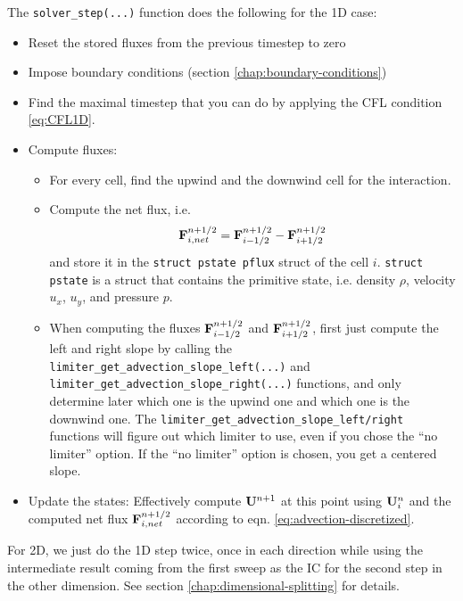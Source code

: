 The \verb|solver_step(...)| function does the following for the 1D case:
\begin{itemize}
	\item 	Reset the stored fluxes from the previous timestep to zero
	\item 	Impose boundary conditions (section \ref{chap:boundary-conditions})
	\item 	Find the maximal timestep that you can do by applying the CFL condition \ref{eq:CFL1D}.
	\item 	Compute fluxes:
	\begin{itemize}
		\item 	For every cell, find the upwind and the downwind cell for the interaction.
		\item 	Compute the net flux, i.e.
				\begin{equation}
				\mathbf{F}_{i, net}^{n+1/2} = \mathbf{F}_{i-1/2}^{n+1/2} - \mathbf{F}_{i+1/2}^{n+1/2}
				\end{equation}
				and store it in the \texttt{struct pstate pflux} struct of the cell $i$.
				\texttt{struct pstate} is a struct that contains the primitive state, i.e. density $\rho$, velocity $u_x$, $u_y$, and pressure $p$.
		\item 	When computing the fluxes $\mathbf{F}_{i-1/2}^{n+1/2}$ and $\mathbf{F}_{i+1/2}^{n+1/2}$, first just compute the left and right slope by calling the \texttt{limiter_get_advection_slope_left(...)} and \texttt{limiter_get_advection_slope_right(...)} functions, and only determine later which one is the upwind one and which one is the downwind one.
				The \verb|limiter_get_advection_slope_left/right| functions will figure out which limiter to use, even if you chose the ``no limiter'' option.
				If the ``no limiter'' option is chosen, you get a centered slope.
	\end{itemize}
	\item 	Update the states: Effectively compute $\mathbf{U}^{n+1}$ at this point using $\mathbf{U}_i^n$ and the computed net flux $\mathbf{F}_{i, net}^{n+1/2}$ according to eqn. \ref{eq:advection-discretized}.
\end{itemize}



For 2D, we just do the 1D step twice, once in each direction while using the intermediate result coming from the first sweep as the IC for the second step in the other dimension.
See section \ref{chap:dimensional-splitting} for details.











